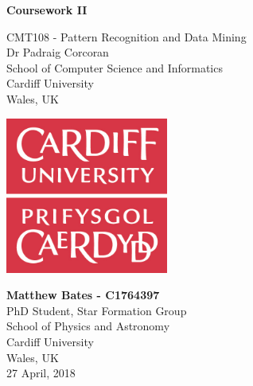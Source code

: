 \documentclass{article}
\author{Matthew Bates}
\begin{document}
\begin{titlepage}
    \begin{center}
        \vspace*{1cm}
        
	\Huge
        \textbf{Coursework II}
        
        \vspace{0.5cm}
	\LARGE
         \vfill

	CMT108 - Pattern Recognition and Data Mining\\
	Dr Padraig Corcoran\\
	School of Computer Science and Informatics\\
	Cardiff University\\
 	Wales, UK
        \vspace{1.5cm}

       	\includegraphics[width=0.4\textwidth]{CardiffLogo.jpg}   
        
        \vspace{0.8cm}
        \Large
        \textbf{Matthew Bates - C1764397}\\
	PhD Student, Star Formation Group\\
        School of Physics and Astronomy\\
        Cardiff University\\
        Wales, UK\\
        27 April, 2018
        
    \end{center}
\end{titlepage}

\end{document}

